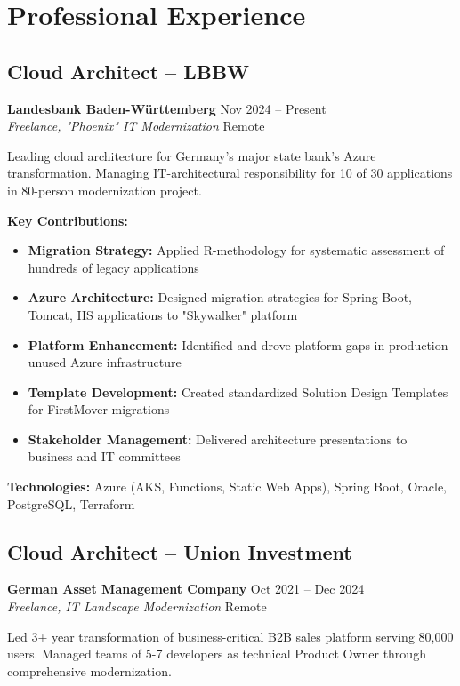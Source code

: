 \documentclass[11pt,a4paper]{article}
\newcommand{\role}[4]{\textbf{#1} \hfill #2 \\ \textit{#3} \hfill #4}
\begin{document}
\newpage

\section{Professional Experience}

\subsection{Cloud Architect -- LBBW}
\role{Landesbank Baden-Württemberg}{Nov 2024 -- Present}{Freelance, "Phoenix" IT Modernization}{Remote}

Leading cloud architecture for Germany's major state bank's Azure transformation. Managing IT-architectural responsibility for 10 of 30 applications in 80-person modernization project.

\textbf{Key Contributions:}
\begin{itemize}
\item \textbf{Migration Strategy:} Applied R-methodology for systematic assessment of hundreds of legacy applications
\item \textbf{Azure Architecture:} Designed migration strategies for Spring Boot, Tomcat, IIS applications to "Skywalker" platform
\item \textbf{Platform Enhancement:} Identified and drove platform gaps in production-unused Azure infrastructure
\item \textbf{Template Development:} Created standardized Solution Design Templates for FirstMover migrations
\item \textbf{Stakeholder Management:} Delivered architecture presentations to business and IT committees
\end{itemize}

\textbf{Technologies:} Azure (AKS, Functions, Static Web Apps), Spring Boot, Oracle, PostgreSQL, Terraform

\subsection{Cloud Architect -- Union Investment}
\role{German Asset Management Company}{Oct 2021 -- Dec 2024}{Freelance, IT Landscape Modernization}{Remote}

Led 3+ year transformation of business-critical B2B sales platform serving 80,000 users. Managed teams of 5-7 developers as technical Product Owner through comprehensive modernization.
\end{document}
